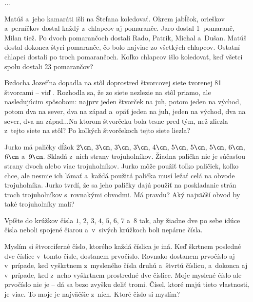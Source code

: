 {%
...}

{%
Matúš a~jeho kamaráti išli na Štefana koledovať. Okrem jabĺčok, orieškov a~perníčkov dostal každý z~chlapcov aj pomaranče. Jaro dostal 1~pomaranč, Milan tiež. Po dvoch pomarančoch dostali Rado, Patrik, Michal a~Dušan. Matúš dostal dokonca štyri pomaranče, čo bolo najviac zo všetkých chlapcov. Ostatní chlapci dostali po troch pomarančoch. Koľko chlapcov išlo koledovať, keď všetci spolu dostali 23 pomarančov?}

{%
Bzdocha Jozefína dopadla na stôl doprostred štvorcovej siete tvorenej 81 štvorcami  -- viď \obr. Rozhodla sa, že zo siete nezlezie na stôl priamo, ale nasledujúcim spôsobom: najprv jeden štvorček na juh, potom jeden na východ, potom dva na sever, dva na západ a~opäť jeden na juh, jeden na východ, dva na sever, dva na západ...Na ktorom štvorčeku bola tesne pred tým, než zliezla z~tejto siete na stôl? Po koľkých štvorčekoch tejto siete liezla?
%
}

{%
Jurko má paličky dĺžok $2\cm$, $3\cm$, $3\cm$, $3\cm$, $4\cm$, $5\cm$, $5\cm$, $5\cm$, $6\cm$, $6\cm$ a~$9\cm$. Skladá z~nich strany trojuholníkov. Žiadna palička nie je súčasťou strany dvoch alebo viac trojuholníkov. Jurko môže použiť toľko paličiek, koľko chce, ale nesmie ich lámať a~každá použitá palička musí ležať celá na obvode trojuholníka. Jurko tvrdí, že sa jeho paličky dajú použiť na poskladanie strán troch trojuholníkov s~rovnakými obvodmi. Má pravdu? Aký najväčší obvod by také trojuholníky mali?}

{%
Vpíšte do krúžkov čísla $1$, $2$, $3$, $4$, $5$, $6$, $7$ a~$8$ tak, aby žiadne dve po sebe idúce čísla neboli
spojené čiarou a~v~sivých krúžkoch boli nepárne čísla.
%
}

{%
Myslím si štvorciferné číslo, ktorého každá číslica je iná. Keď škrtnem posledné dve číslice v~tomto čísle, dostanem prvočíslo. Rovnako dostanem prvočíslo aj v~prípade, keď vyškrtnem z~mysleného čísla druhú a~štvrtú číslicu, a~dokonca aj v~prípade, keď z~neho vyškrtnem prostredné dve číslice. Moje myslené číslo ale prvočíslo nie je -- dá sa bezo zvyšku deliť tromi. Čísel, ktoré majú tieto vlastnosti, je viac. To moje je najväčšie z~nich. Ktoré číslo si myslím?}

